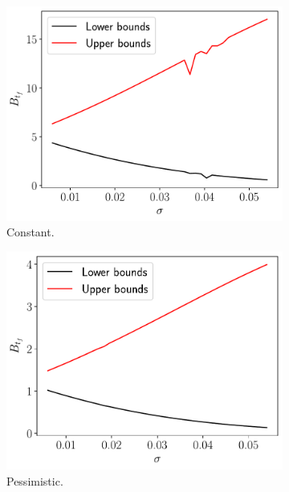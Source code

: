 \documentclass[11pt]{article}
\theoremstyle{definition}
\theoremstyle{remark}
\theoremstyle{remark}
\begin{document}
\begin{figure}[t]
  \centering
  \begin{subfigure}[b]{0.45\textwidth}
      \centering
      \includegraphics[scale=0.45]{sens_constant.pdf}
      \caption{Constant.}
  \end{subfigure}
  \begin{subfigure}[b]{0.45\textwidth}
      \centering
      \includegraphics[scale=0.45]{sens_pessimistic.pdf}
      \caption{Pessimistic.}
  \end{subfigure}
  \begin{subfigure}[b]{0.45\textwidth}
      \centering

\end{subfigure}
\end{figure}
\end{document}
